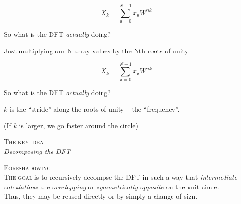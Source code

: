 \documentclass[14pt]{beamer}
\begin{document}
\begin{frame}
    \begin{equation*}
        X_k = \sum_{n=0}^{N-1} x_n W^{nk}
    \end{equation*}

    \centering
    So what is the DFT \textit{actually} doing?\\[1em]

    \pause

    \begin{figure}
        \centering
        
        
    \end{figure}

    \scriptsize{Just multiplying our N array values by the Nth roots of unity!}
\end{frame}

\begin{frame}
    \begin{equation*}
        X_k = \sum_{n=0}^{N-1} x_n W^{nk}
    \end{equation*}

    \centering
    So what is the DFT \textit{actually} doing?\\[1em]

    \begin{figure}
        \centering
        
        
    \end{figure}

    \scriptsize{$k$ is the ``stride'' along the roots of unity -- the ``frequency''.}

    \tiny{(If $k$ is larger, we go faster around the circle)}
\end{frame}

\begin{frame}
    \centering
    \textsc{\large The key idea}\\
    \textit{\scriptsize Decomposing the DFT}
\end{frame}


\begin{frame}
    \begin{center}
        \textsc{Foreshadowing}\\[.5em]
        \scriptsize{\textsc{The goal} is to recursively decompse the DFT in such a way that {\em intermediate calculations}
        are {\em overlapping} or {\em symmetrically opposite} on the unit circle.}\\[1em]

        \tiny{Thus, they may be reused directly or by simply a change of sign.}
    \end{center}
\end{frame}
\end{document}
